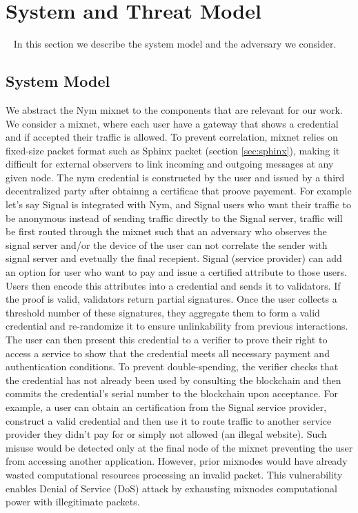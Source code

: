 \section{System and Threat Model}~\label{sec:sys_model}
In this section we describe the system model and the adversary we consider.
\subsection{System Model}
We abstract the Nym mixnet to the components that are relevant for our work. We consider a mixnet, where each user have a gateway that shows a credential and if accepted their traffic is allowed. 
To prevent correlation, mixnet relies on fixed-size packet format such as Sphinx packet (section \ref{sec:sphinx}), making it difficult for external observers to link incoming and outgoing messages at any given node.
 The nym credential is constructed by the user and issued by a third decentralized party after obtainng a certificae that proove payement.
For example let's say Signal is integrated with Nym, and Signal users who want their traffic to be anonymous instead of sending traffic directly to the Signal server, traffic will be first routed through the mixnet such that an adversary who observes the signal server and/or the device of the user can not correlate the sender with signal server and evetually the final recepient. Signal (service provider) can add an option for user who want to pay and issue a certified attribute to those users. Users then encode this attributes into a credential and sends it to validators. If the proof is valid, validators return partial signatures. Once the user collects a threshold number of these signatures, they aggregate them to form a valid credential and re-randomize it to ensure unlinkability from previous interactions. The user can then present this credential to a verifier to prove their right to access a service to show that the credential meets all necessary payment and authentication conditions. To prevent double-spending, the verifier checks that the credential has not already been used by consulting the blockchain and then commits the credential's serial number to the blockchain upon acceptance.
For example, a user can obtain an certification from the Signal service provider, construct a valid credential and then use it to route traffic to another service provider they didn't pay for or simply not allowed (an illegal website).
Such misuse would be detected only at the final node of the mixnet preventing the user from accessing another application. 
However, prior mixnodes would have already wasted computational resources processing an invalid packet. 
This vulnerability enables Denial of Service (DoS) attack by exhausting mixnodes computational power with illegitimate packets.

